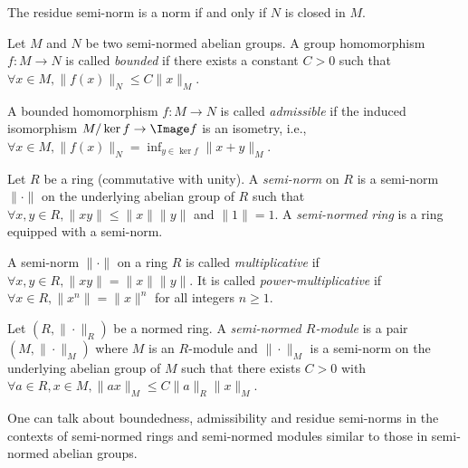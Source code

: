     \begin{remark}\label{rmk:residue_semi-norm}
        The residue semi-norm is a norm if and only if \(N\) is closed in \(M\).
    \end{remark}

    \begin{definition}\label{def:bounded_and_admissible_homomorphism}
        Let \(M\) and \(N\) be two semi-normed abelian groups.
        A group homomorphism \(f: M \to N\) is called \emph{bounded} if there exists a constant \(C > 0\) such that \(\forall x \in M, \|f(x)\|_N \leq C\|x\|_M\).
        
        A bounded homomorphism \(f: M \to N\) is called \emph{admissible} if the induced isomorphism \(M/\ker f \to \Image f\) is an isometry, i.e., \(\forall x \in M, \|f(x)\|_N = \inf_{y \in \ker f} \|x + y\|_M\).
    \end{definition}

    \begin{definition}\label{def:semi-normed_rings}
        Let \(R\) be a ring (commutative with unity).
        A \emph{semi-norm} on \(R\) is a semi-norm \(\|\cdot\|\) on the underlying abelian group of \(R\) such that \(\forall x,y \in R, \|xy\| \leq \|x\|\|y\|\) and \(\|1\| = 1\).
        A \emph{semi-normed ring} is a ring equipped with a semi-norm.
    \end{definition}

    \begin{definition}\label{def:multiplicative_and_power_multiplicative_semi-norm}
        A semi-norm \(\|\cdot\|\) on a ring \(R\) is called \emph{multiplicative} if \(\forall x,y \in R, \|xy\| = \|x\|\|y\|\).
        It is called \emph{power-multiplicative} if \(\forall x \in R, \|x^n\| = \|x\|^n\) for all integers \(n \geq 1\).
    \end{definition}

    \begin{definition}\label{def:semi-normed_modules}
        Let \((R, \|\cdot\|_R)\) be a normed ring.
        A \emph{semi-normed \(R\)-module} is a pair \((M, \|\cdot\|_M)\) where \(M\) is an \(R\)-module and \(\|\cdot\|_M\) is a semi-norm on the underlying abelian group of \(M\) such that there exists \(C > 0\) with \(\forall a \in R, x \in M, \|ax\|_M \leq C \|a\|_R \|x\|_M\).
    \end{definition}

    One can talk about boundedness, admissibility and residue semi-norms in the contexts of semi-normed rings and semi-normed modules similar to those in semi-normed abelian groups.


